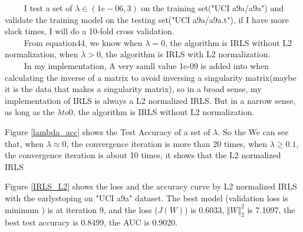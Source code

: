 \documentclass[a4paper]{article}
\begin{document}
$\qquad$ I test a set of $\lambda \in (1e-06,3)$ on the training set("UCI a9a/a9a") and validate the training model on the testing set("UCI a9a/a9a.t"), if I have more slack times, I will do a 10-fold cross validation. \\
$\qquad$ From equation44, we know when $\lambda=0$, the algorithm is IRLS without L2 normalization, when $\lambda>0$, the algorithm is IRLS with L2 normalization. \\
$\qquad$ In my implementation, A very samll value 1e-09 is added into when calculating the inverse of a matrix to avoid inversing a singularity matrix(maybe it is the data that makes a singularity matrix), so in a broad sense, my implementation of IRLS is always a L2 normalized IRLS. But in a narrow sense, as long as the $\lambda to 0$, the algorithm is IRLS without L2 normalization.



Figure \ref{lambda_acc} shows the Test Accuracy of a set of $\lambda$.  So the We can see that, when $\lambda \approx 0$, the convergence iteration is more than 20 times, when $\lambda \ge 0.1$, the convergence iteration is about 10 times, it shows that the L2 normalized IRLS 

Figure \ref{IRLS_L2} shows the loss and the accuracy curve by L2 normalized IRLS with the earlystoping on "UCI a9a" dataset.  The best model (validation loss is minimum ) is at iteration 9, and the loss ($J(W)$) is 0.6033, $\Vert W \Vert_2^2$ is 7.1097, the best test accuracy is 0.8499, the AUC is 0.9020. 


%
\end{document}
